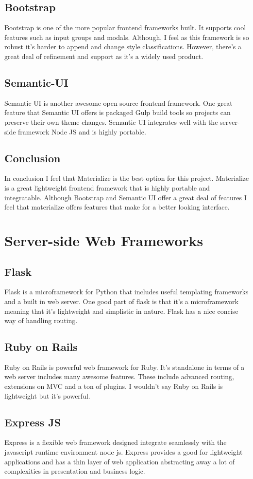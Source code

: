 \documentclass[onecolumn, draftclsnofoot,10pt, compsoc]{IEEEtran}
\begin{document}
\subsection{Bootstrap}
Bootstrap is one of the more popular frontend frameworks built. It supports cool features such as input groups and modals. Although, I feel as this framework is so robust it’s harder to append and change style classifications. However, there’s a great deal of refinement and support as it’s a widely used product. 
\subsection{Semantic-UI}
Semantic UI is another awesome open source frontend framework. One great feature that Semantic UI offers is packaged Gulp build tools so projects can preserve their own theme changes. Semantic UI integrates well with the server-side framework Node JS and is highly portable. 
\subsection{Conclusion}
In conclusion I feel that Materialize is the best option for this project. Materialize is a great lightweight frontend framework that is highly portable and integratable. Although Bootstrap and Semantic UI offer a great deal of features I feel that materialize offers features that make for a better looking interface.
\section{Server-side Web Frameworks}
\subsection{Flask}
Flask is a microframework for Python that includes useful templating frameworks and a built in web server. One good part of flask is that it’s a microframework meaning that it’s lightweight and simplistic in nature. Flask has a nice concise way of handling routing.
\subsection{Ruby on Rails}
Ruby on Rails is powerful web framework for Ruby. It’s standalone in terms of a web server includes many awesome features. These include advanced routing, extensions on MVC and a ton of plugins. I wouldn’t say Ruby on Rails is lightweight but it’s powerful.
\subsection{Express JS}
Express is a flexible web framework designed integrate seamlessly with the javascript runtime environment node js. Express provides a good for lightweight applications and has a thin layer of web application abstracting away a lot of complexities in presentation and business logic.
\end{document}
